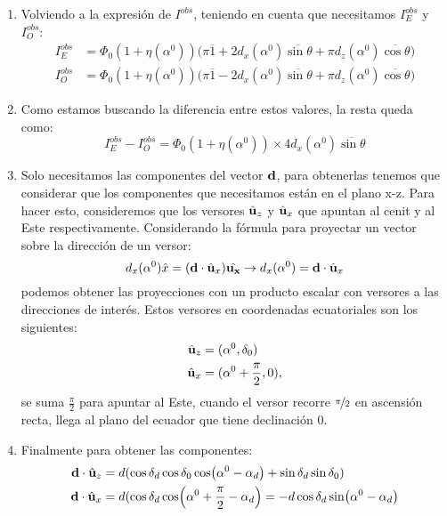     \begin{enumerate}
    \item 
   
    Volviendo a la expresión de $I^{obs}$, teniendo en cuenta que necesitamos  $I^{obs}_E$ y $I^{obs}_O$:
    \begin{align*}
        I^{obs}_E&= \Phi_0 (1+ \eta(\alpha^0)) \Big( \pi\overline{1} + 2d_x(\alpha^0)\overline{\sin\theta} + \pi d_z(\alpha^0)\overline{\cos\theta}  \Big) \\
        I^{obs}_O&= \Phi_0 (1+ \eta(\alpha^0)) \Big( \pi \overline{1} - 2d_x(\alpha^0)\overline{\sin\theta}   + \pi d_z(\alpha^0)\overline{\cos\theta} \Big) 
    \end{align*}

    \item Como estamos buscando la diferencia entre estos valores, la resta queda como:
    \begin{equation*}
        I^{obs}_E -  I^{obs}_O = \Phi_0 (1+ \eta(\alpha^0)) \times 4  d_x(\alpha^0)\overline{\sin\theta}
    \end{equation*}
    
    \item Solo necesitamos las componentes del vector $\bf{d}$, para obtenerlas tenemos que considerar que los componentes que necesitamos están en el plano x-z. Para hacer esto, consideremos que los versores $\hat{\bf{u}}_z$ y $\hat{\bf{u}}_x$ que apuntan al cenit y al Este respectivamente. Considerando la fórmula para proyectar un vector sobre la dirección de un versor:
    \begin{equation}
        d_x(\alpha^0) \hat{x} =  (\textbf{d}\cdot\hat{\bf{u}}_x)\hat{\bf{u_x}} \rightarrow d_x(\alpha^0) = \textbf{d}\cdot\hat{\bf{u}}_x
    \end{equation}
    podemos obtener las proyecciones con un producto escalar con versores a las direcciones de interés. Estos versores en coordenadas ecuatoriales son los siguientes:
    \begin{align*}
        \hat{\bf{u}}_z &= (\alpha^0,\delta_0 )\\
        \hat{\bf{u}}_x &= (\alpha^0 + \frac{\pi}{2},0), 
    \end{align*}
    se suma  $\frac{\pi}{2}$ para apuntar al Este, cuando el versor recorre $\nicefrac{\pi}{2}$ en ascensión recta, llega al plano del ecuador que tiene declinación $0$.
    \item Finalmente para obtener las componentes:
    \begin{align*}
        \textbf{d}\cdot\hat{\bf{u}}_z &= d (\cos\delta_d \cos\delta_0 \cos(\alpha^0 - \alpha_d) + \sin\delta_d  \sin\delta_0)\\
        \textbf{d}\cdot\hat{\bf{u}}_x &= d (\cos\delta_d \cos(\alpha^0 +\frac{\pi}{2} - \alpha_d) 
        = -d\cos\delta_d \sin(\alpha^0  - \alpha_d)
    \end{align*}
    

\end{enumerate}
